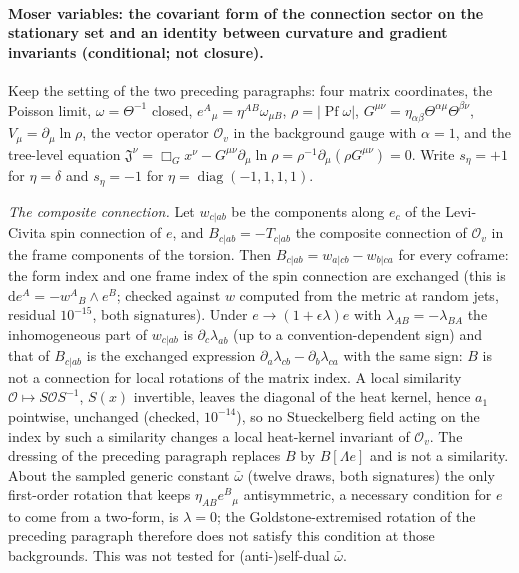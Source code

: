 \paragraph{Moser variables: the covariant form of the connection sector on the stationary set and an identity between curvature and gradient invariants (conditional; not closure).}
Keep the setting of the two preceding paragraphs: four matrix coordinates, the Poisson limit, \(\omega=\Theta^{-1}\) closed, \(e^A{}_\mu=\eta^{AB}\omega_{\mu B}\), \(\rho=\lvert\operatorname{Pf}\omega\rvert\), \(G^{\mu\nu}=\eta_{\alpha\beta}\Theta^{\alpha\mu}\Theta^{\beta\nu}\), \(V_\mu=\partial_\mu\ln\rho\), the vector operator \(\mathcal O_v\) in the background gauge with \(\alpha=1\), and the tree-level equation \(\mathfrak J^\nu=\Box_Gx^\nu-G^{\mu\nu}\partial_\mu\ln\rho=\rho^{-1}\partial_\mu(\rho G^{\mu\nu})=0\). Write \(s_\eta=+1\) for \(\eta=\delta\) and \(s_\eta=-1\) for \(\eta=\operatorname{diag}(-1,1,1,1)\).

\emph{The composite connection.} Let \(w_{c|ab}\) be the components along \(e_c\) of the Levi-Civita spin connection of \(e\), and \(B_{c|ab}=-T_{c|ab}\) the composite connection of \(\mathcal O_v\) in the frame components of the torsion. Then \(B_{c|ab}=w_{a|cb}-w_{b|ca}\) for every coframe: the form index and one frame index of the spin connection are exchanged (this is \(\mathrm de^A=-w^A{}_B\wedge e^B\); checked against \(w\) computed from the metric at random jets, residual \(10^{-15}\), both signatures). Under \(e\to(1+\epsilon\lambda)e\) with \(\lambda_{AB}=-\lambda_{BA}\) the inhomogeneous part of \(w_{c|ab}\) is \(\partial_c\lambda_{ab}\) (up to a convention-dependent sign) and that of \(B_{c|ab}\) is the exchanged expression \(\partial_a\lambda_{cb}-\partial_b\lambda_{ca}\) with the same sign: \(B\) is not a connection for local rotations of the matrix index. A local similarity \(\mathcal O\mapsto S\mathcal OS^{-1}\), \(S(x)\) invertible, leaves the diagonal of the heat kernel, hence \(a_1\) pointwise, unchanged (checked, \(10^{-14}\)), so no Stueckelberg field acting on the index by such a similarity changes a local heat-kernel invariant of \(\mathcal O_v\). The dressing of the preceding paragraph replaces \(B\) by \(B[\Lambda e]\) and is not a similarity. About the sampled generic constant \(\bar\omega\) (twelve draws, both signatures) the only first-order rotation that keeps \(\eta_{AB}e^B{}_\mu\) antisymmetric, a necessary condition for \(e\) to come from a two-form, is \(\lambda=0\); the Goldstone-extremised rotation of the preceding paragraph therefore does not satisfy this condition at those backgrounds. This was not tested for (anti-)self-dual \(\bar\omega\).

